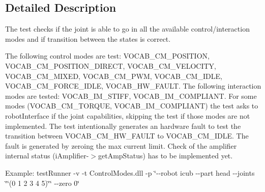 \subsection{Detailed Description}
The test checks if the joint is able to go in all the available control/interaction modes and if transition between the states is correct. 

The following control modes are test\+: V\+O\+C\+A\+B\+\_\+\+C\+M\+\_\+\+P\+O\+S\+I\+T\+I\+ON, V\+O\+C\+A\+B\+\_\+\+C\+M\+\_\+\+P\+O\+S\+I\+T\+I\+O\+N\+\_\+\+D\+I\+R\+E\+CT, V\+O\+C\+A\+B\+\_\+\+C\+M\+\_\+\+V\+E\+L\+O\+C\+I\+TY, V\+O\+C\+A\+B\+\_\+\+C\+M\+\_\+\+M\+I\+X\+ED, V\+O\+C\+A\+B\+\_\+\+C\+M\+\_\+\+P\+WM, V\+O\+C\+A\+B\+\_\+\+C\+M\+\_\+\+I\+D\+LE, V\+O\+C\+A\+B\+\_\+\+C\+M\+\_\+\+F\+O\+R\+C\+E\+\_\+\+I\+D\+LE, V\+O\+C\+A\+B\+\_\+\+H\+W\+\_\+\+F\+A\+U\+LT. The following interaction modes are tested\+: V\+O\+C\+A\+B\+\_\+\+I\+M\+\_\+\+S\+T\+I\+FF, V\+O\+C\+A\+B\+\_\+\+I\+M\+\_\+\+C\+O\+M\+P\+L\+I\+A\+NT. For some modes (V\+O\+C\+A\+B\+\_\+\+C\+M\+\_\+\+T\+O\+R\+Q\+UE, V\+O\+C\+A\+B\+\_\+\+I\+M\+\_\+\+C\+O\+M\+P\+L\+I\+A\+NT) the test asks to robot\+Interface if the joint capabilities, skipping the test if those modes are not implemented. The test intentionally generates an hardware fault to test the transition between V\+O\+C\+A\+B\+\_\+\+C\+M\+\_\+\+H\+W\+\_\+\+F\+A\+U\+LT to V\+O\+C\+A\+B\+\_\+\+C\+M\+\_\+\+I\+D\+LE. The fault is generated by zeroing the max current limit. Check of the amplifier internal status (i\+Amplifier-\/$>$get\+Amp\+Status) has to be implemented yet.

Example\+: test\+Runner -\/v -\/t Control\+Modes.\+dll -\/p \char`\"{}-\/-\/robot icub -\/-\/part head -\/-\/joints \char`\"{}\char`\"{}(0 1 2 3 4 5)\char`\"{}\char`\"{} -\/-\/zero 0\char`\"{}

